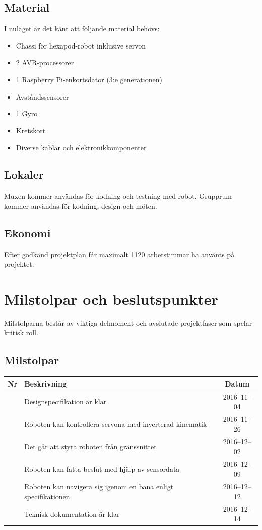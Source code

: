\documentclass[a4paper,titlepage,12pt]{article}
\newcounter{milNr}
\newcommand{\nextMilNr}{\stepcounter{milNr}\arabic{milNr}}
\begin{document}
	\subsection{Material}
    I nuläget är det känt att följande material behövs:
	\begin{itemize}
			\item Chassi för hexapod-robot inklusive servon
			\item 2 AVR-processorer
			\item 1 Raspberry Pi-enkortsdator (3:e generationen)
			\item Avståndssensorer
            \item 1 Gyro
            \item Kretskort
            \item Diverse kablar och elektronikkomponenter
	\end{itemize}
	
	
	\subsection{Lokaler}
	Muxen kommer användas för kodning och testning med robot. Grupprum kommer
	användas för kodning, design och möten.
	
	
	\subsection{Ekonomi}
	Efter godkänd projektplan får maximalt 1120 arbetstimmar ha använts på projektet.
	
	
	\section{Milstolpar och beslutspunkter}
	Milstolparna består av viktiga delmoment och avslutade projektfaser som
	spelar kritisk roll. 
	
	\subsection{Milstolpar}
	\begin{longtable}[c]{ c l c}
		\textbf{Nr} & \textbf{Beskrivning} & \textbf{Datum} \\ \midrule
		\nextMilNr{} & Designspecifikation är klar & 2016--11--04 \\ \midrule
		\nextMilNr{} & Roboten kan kontrollera servona med inverterad kinematik
        & 2016--11--26 \\ \midrule
		\nextMilNr{} & Det går att styra roboten från gränssnittet &
        2016--12--02 \\ \midrule
		\nextMilNr{} & Roboten kan fatta beslut med hjälp av sensordata &
        2016--12--09 \\ \midrule
		\nextMilNr{} & Roboten kan navigera sig igenom en bana enligt
        specifikationen & 2016--12--12 \\ \midrule
		\nextMilNr{} & Teknisk dokumentation är klar & 2016--12--14 \\ \midrule
	\end{longtable}
	
\end{document}
